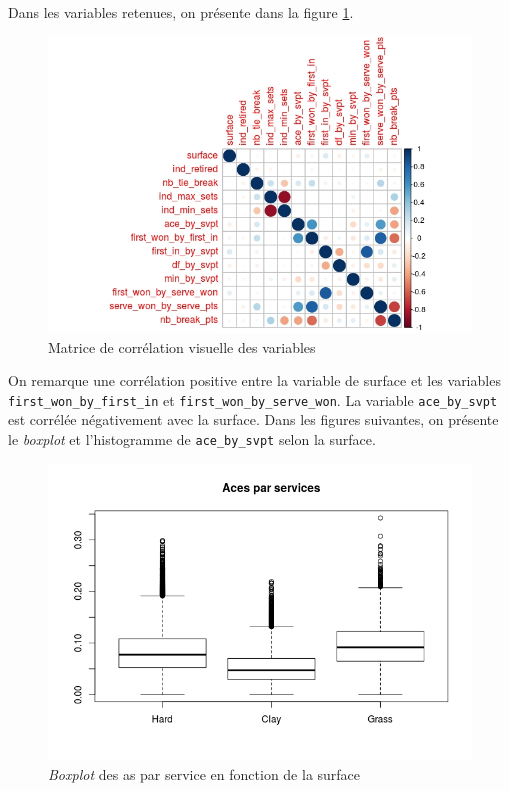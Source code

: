 Dans les variables retenues, on présente dans la figure \ref{fig:corrplot}.

\begin{figure}[H]
	\caption{Matrice de corrélation visuelle des variables}
	\label{fig:corrplot}
	\includegraphics[width=\textwidth]{corrplot}
\end{figure}

On remarque une corrélation positive entre la variable de surface et les variables \texttt{first\_won\_by\_first\_in} et \texttt{first\_won\_by\_serve\_won}. La variable \texttt{ace\_by\_svpt} est corrélée négativement avec la surface. Dans les figures suivantes, on présente le \textit{boxplot} et l'histogramme de \texttt{ace\_by\_svpt} selon la surface.

\begin{figure}[H]
	\caption{\textit{Boxplot} des as par service en fonction de la surface}
	\label{fig:acebyserve}
	\includegraphics[width=\textwidth]{acevssurface}
\end{figure}

